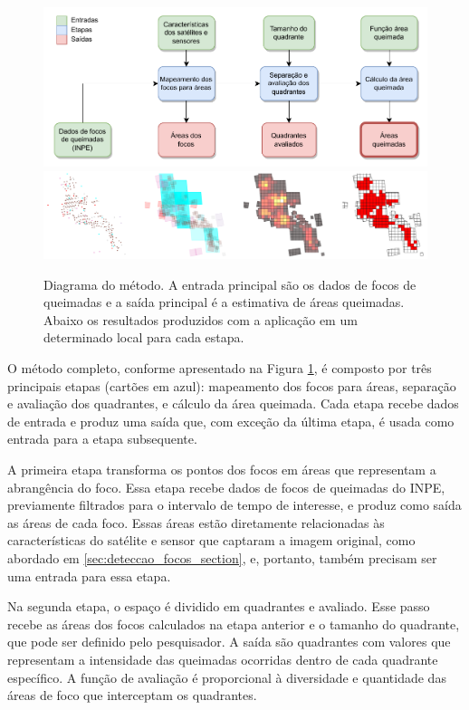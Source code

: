 \documentclass[cic,tc]{iiufrgs}
\begin{document}
\begin{figure}[H]
    \caption{Diagrama do método. A entrada principal são os dados de focos de queimadas e a saída principal é a estimativa de áreas queimadas. Abaixo os resultados produzidos com a aplicação em um determinado local para cada estapa.}
    \begin{center}
        \includegraphics[width=35em]{metodologica_workflow}
        \includegraphics[width=35em]{exemplo_metodo_completo}
    \end{center}
    \label{fig:metodologica_workflow}
\end{figure}

O método completo, conforme apresentado na Figura \ref{fig:metodologica_workflow}, é composto por três principais etapas (cartões em azul): mapeamento dos focos para áreas, separação e avaliação dos quadrantes, e cálculo da área queimada. Cada etapa recebe dados de entrada e produz uma saída que, com exceção da última etapa, é usada como entrada para a etapa subsequente.

A primeira etapa transforma os pontos dos focos em áreas que representam a abrangência do foco. Essa etapa recebe dados de focos de queimadas do INPE, previamente filtrados para o intervalo de tempo de interesse, e produz como saída as áreas de cada foco. Essas áreas estão diretamente relacionadas às características do satélite e sensor que captaram a imagem original, como abordado em \ref{sec:deteccao_focos_section}, e, portanto, também precisam ser uma entrada para essa etapa.

Na segunda etapa, o espaço é dividido em quadrantes e avaliado. Esse passo recebe as áreas dos focos calculados na etapa anterior e o tamanho do quadrante, que pode ser definido pelo pesquisador. A saída são quadrantes com valores que representam a intensidade das queimadas ocorridas dentro de cada quadrante específico. A função de avaliação é proporcional à diversidade e quantidade das áreas de foco que interceptam os quadrantes.
\end{document}
